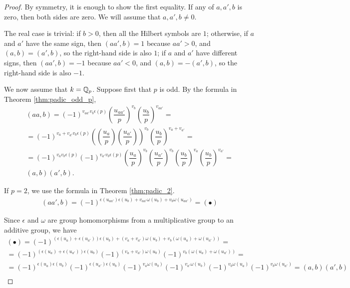 \begin{proof}
By symmetry, it is enough to show the first equality.
If any of $a, a', b$ is zero, then both sides are zero. We will assume that $a,a',b \neq 0$.

The real case is trivial: if $b > 0$, then all the Hilbert symbols are $1$; otherwise,
if $a$ and $a'$ have the same sign, then $(aa',b) = 1$ because $aa' > 0$, and $(a,b) = (a',b)$, so
the right-hand side is also $1$;
if $a$ and $a'$ have different signs, then $(aa',b) = -1$ because $aa' < 0$, and $(a,b) = -(a',b)$,
so the right-hand side is also $-1$.

We now assume that $k=\mathbb{Q}_p$. Suppose first that $p$ is odd. By the formula in Theorem \ref{thm:padic_odd_p},
\begin{align*}
(aa,b) = (-1)^{v_{aa'}v_b\epsilon(p)}\left(\dfrac{u_{aa'}}{p}\right)^{v_b}\left(\dfrac{u_b}{p}\right)^{v_{aa'}}=\\
=(-1)^{v_a+v_{a'}v_b\epsilon(p)}\left(\left(\dfrac{u_{a}}{p}\right)\left(\dfrac{u_{a'}}{p}\right)\right)^{v_b}\left(\dfrac{u_b}{p}\right)^{v_a+v_{a'}}=\\
=(-1)^{v_av_b\epsilon(p)}(-1)^{v_{a'}v_b\epsilon(p)}\left(\dfrac{u_{a}}{p}\right)^{v_b}\left(\dfrac{u_{a'}}{p}\right)^{v_b}\left(\dfrac{u_b}{p}\right)^{v_a}\left(\dfrac{u_b}{p}\right)^{v_{a'}}=\\
(a,b)(a',b).
\end{align*}

If $p=2$, we use the formula in Theorem \ref{thm:padic_2}.
\begin{align*}
(aa',b) = (-1)^{\epsilon(u_{aa'})\epsilon(u_b) + v_{aa'} \omega(u_b) + v_b \omega(u_{aa'})} = (\bullet)
\end{align*}

Since $\epsilon$ and $\omega$ are group homomorphisms from a multiplicative group to an additive group, we have
\begin{align*}
	(\bullet) = (-1)^{(\epsilon(u_{a})+\epsilon(u_{a'}))\epsilon(u_b) + (v_{a}+v_{a'}) \omega(u_b) + v_b (\omega(u_a)+\omega(u_{a'}))}=\\
	=(-1)^{(\epsilon(u_{a})+\epsilon(u_{a'}))\epsilon(u_b)} (-1)^{(v_{a}+v_{a'}) \omega(u_b)} (-1)^{v_b (\omega(u_a)+\omega(u_{a'}))}=\\
	=(-1)^{\epsilon(u_{a})\epsilon(u_b)}(-1)^{\epsilon(u_{a'})\epsilon(u_b)} (-1)^{v_{a} \omega(u_b)}(-1)^{v_{a'} \omega(u_b)}(-1)^{v_b \omega(u_a)}(-1)^{v_b \omega(u_{a'})}=(a,b)(a',b)\\
\end{align*}

\end{proof}



